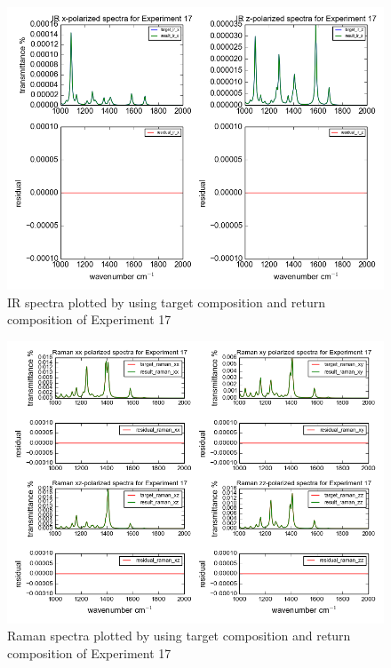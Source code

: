 \begin{figure}[!ht] \label{fig:4.2}
\centering
\includegraphics[scale=0.5]{Figures/chapter4_result_target_plotting_5datapoint_ir.png}
\caption{IR spectra plotted by using target composition and return composition of Experiment 17} 
\end{figure}

\begin{figure}[!ht] \label{fig:4.3}
\centering
\includegraphics[scale=0.7]{Figures/chapter4_result_target_plotting_5datapoint_raman.png}
\caption{Raman spectra plotted by using target composition and return composition of Experiment 17} 
\end{figure}

